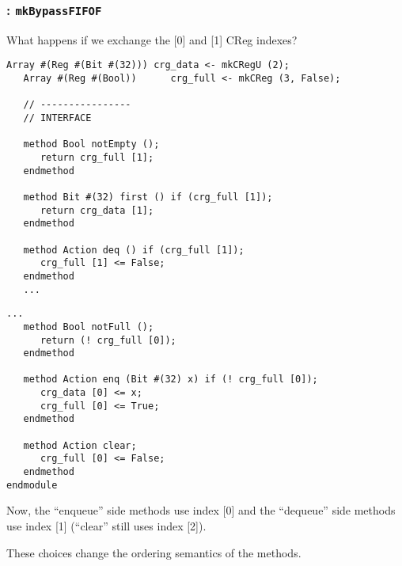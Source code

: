 \begin{frame}[fragile]
\frametitle{{\BSV}: {\tt mkBypassFIFOF}}

\label{mkBypassFIFOF}

\footnotesize

What happens if we exchange the [0] and [1] CReg indexes?

\begin{center}
\begin{minipage}[t]{0.485\textwidth}\scriptsize
\begin{Verbatim}[frame=single]
   Array #(Reg #(Bit #(32))) crg_data <- mkCRegU (2);
   Array #(Reg #(Bool))      crg_full <- mkCReg (3, False);

   // ----------------
   // INTERFACE

   method Bool notEmpty ();
      return crg_full [1];
   endmethod

   method Bit #(32) first () if (crg_full [1]);
      return crg_data [1];
   endmethod

   method Action deq () if (crg_full [1]);
      crg_full [1] <= False;
   endmethod
   ...
\end{Verbatim}
\end{minipage}
\begin{minipage}[t]{0.485\textwidth}\scriptsize
\begin{Verbatim}[frame=single]
   ...
   method Bool notFull ();
      return (! crg_full [0]);
   endmethod

   method Action enq (Bit #(32) x) if (! crg_full [0]);
      crg_data [0] <= x;
      crg_full [0] <= True;
   endmethod

   method Action clear;
      crg_full [0] <= False;
   endmethod
endmodule
\end{Verbatim}

\vspace{1ex}

Now, the ``enqueue'' side methods use index [0] and the ``dequeue''
side methods use index [1] (``clear'' still uses index [2]).

\vspace{1ex}

These choices change the ordering semantics of the methods.

\end{minipage}
\end{center}

\end{frame}


